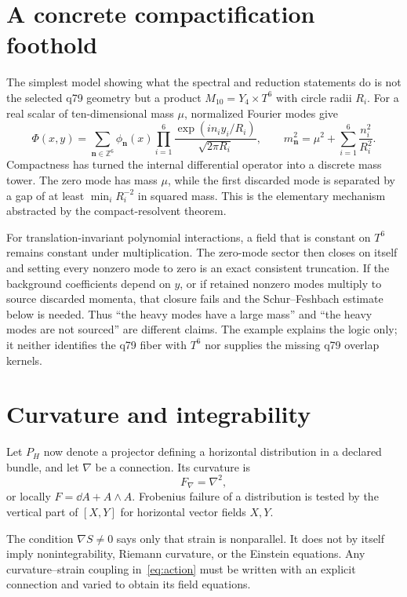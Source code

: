 \documentclass[11pt]{article}
\begin{document}
\section{A concrete compactification foothold}

The simplest model showing what the spectral and reduction statements do is
not the selected q79 geometry but a product
$M_{10}=Y_4\times T^6$ with circle radii $R_i$.  For a real scalar of
ten-dimensional mass $\mu$, normalized Fourier modes give
\[
\Phi(x,y)=
\sum_{\mathbf n\in\mathbb Z^6}
\phi_{\mathbf n}(x)
\prod_{i=1}^{6}
\frac{\exp(i n_i y_i/R_i)}{\sqrt{2\pi R_i}},
\qquad
m_{\mathbf n}^2
=\mu^2+\sum_{i=1}^{6}\frac{n_i^2}{R_i^2}.
\]
Compactness has turned the internal differential operator into a discrete
mass tower.  The zero mode has mass $\mu$, while the first discarded mode is
separated by a gap of at least
$\min_i R_i^{-2}$ in squared mass.  This is the elementary mechanism abstracted
by the compact-resolvent theorem.

For translation-invariant polynomial interactions, a field that is constant
on $T^6$ remains constant under multiplication.  The zero-mode sector then
closes on itself and setting every nonzero mode to zero is an exact consistent
truncation.  If the background coefficients depend on $y$, or if retained
nonzero modes multiply to source discarded momenta, that closure fails and
the Schur--Feshbach estimate below is needed.  Thus ``the heavy modes have a
large mass'' and ``the heavy modes are not sourced'' are different claims.
The example explains the logic only; it neither identifies the q79 fiber with
$T^6$ nor supplies the missing q79 overlap kernels.

\section{Curvature and integrability}

Let $P_H$ now denote a projector defining a horizontal distribution in a
declared bundle, and let $\nabla$ be a connection.  Its curvature is
\[
 F_\nabla=\nabla^2,
\]
or locally $F=\dd A+A\wedge A$.  Frobenius failure of a distribution is tested
by the vertical part of $[X,Y]$ for horizontal vector fields $X,Y$.

The condition $\nabla S\ne0$ says only that strain is nonparallel.  It does not
by itself imply nonintegrability, Riemann curvature, or the Einstein equations.
Any curvature--strain coupling in~\eqref{eq:action} must be written with an
explicit connection and varied to obtain its field equations.
\end{document}
